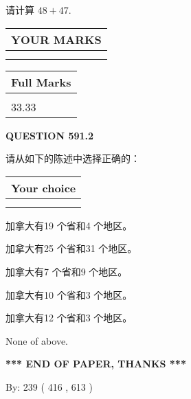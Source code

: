 \documentclass{ctexart}
\begin{document}
  
 
请计算 $ %
48 +  %
47 $.
 

 

 
  
\vspace{0.2in}
  
\noindent\begin{tabular}{|l|}
\hline
 YOUR MARKS  \\
\hline
 \\ 
 \\ 
\hline
\end{tabular}
\hspace{0.05in} \begin{tabular}{|l|}
\hline
 Full Marks  \\
\hline
 \\ 
33.33 \\
\hline
\end{tabular}
{\textbf{\Large{QUESTION
591.2 
}}}
  
  
请从如下的陈述中选择正确的：
  
  
\noindent\hspace{3.0in} \begin{tabular}{|l|}
\hline
Your choice \\
\hline
 \\ 
 \\ 
\hline
\end{tabular}
  
  
 
 
加拿大有19 个省和4 个地区。
 
 
加拿大有25 个省和31 个地区。
 
 
加拿大有7 个省和9 个地区。
 
 
加拿大有10 个省和3 个地区。
 
 
加拿大有12 个省和3 个地区。
 
 
 None of above.
 
 
   
   
 \vspace{0.2in}
 
   
   
   
   
\vspace{1.0in} 
{\textbf{\large{ *** END OF PAPER, THANKS *** }}} 
   
   
\hspace{1.0in} By: 
 239 ( 416 ,  613 )
   
\end{document}
